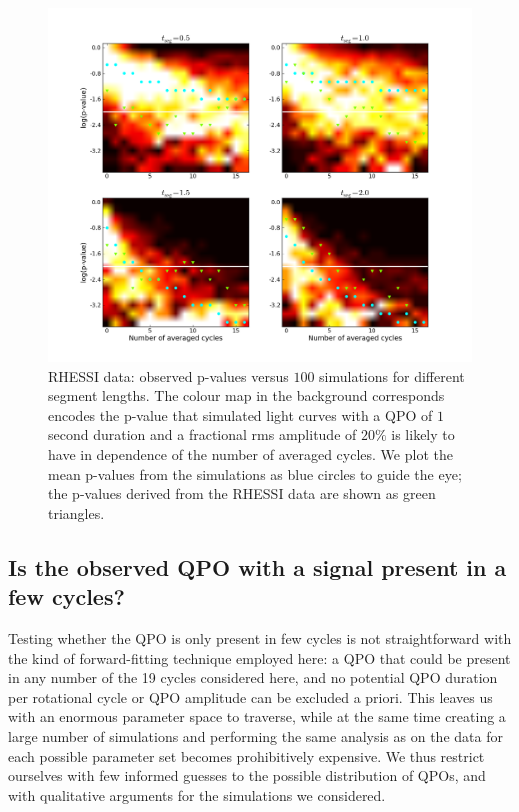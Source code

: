 \documentclass{emulateapj}
\begin{document}
\begin{figure}[htbp]
\begin{center}
\includegraphics[width=\textwidth]{1806_rhessi_1ssignal_randomphase_pvalues.png}
\caption{RHESSI data: observed p-values versus $100$ simulations for different segment lengths. The colour map in the background corresponds encodes the p-value that simulated light curves with a QPO of $1$ second duration and a fractional rms amplitude of $20\%$ is likely to have in dependence of the number of averaged cycles. We plot the mean p-values from the simulations as blue circles to guide the eye; the p-values derived from the RHESSI data are shown as green triangles.}
\label{fig:rhessi_sims2_pvalues}
\end{center}
\end{figure}



\subsection{Is the observed QPO with a signal present in a few cycles?}

Testing whether the QPO is only present in few cycles is not straightforward with the kind of forward-fitting technique employed here: a QPO that could be present in any number of the 19 cycles considered here, and no potential QPO duration per rotational cycle or QPO amplitude can be excluded a priori. This leaves us with an enormous parameter space to traverse, while at the same time creating a large number of simulations and performing the same analysis as on the data for each possible parameter set becomes prohibitively expensive. We thus restrict ourselves with few informed guesses to the possible distribution of QPOs, and with qualitative arguments for the simulations we considered. 
\end{document}
